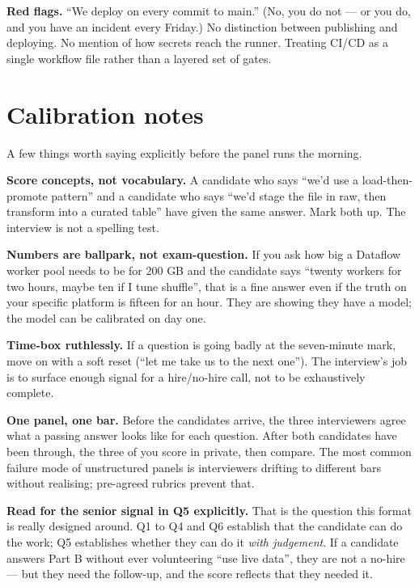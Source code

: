 \documentclass[
  11pt,
  british,
  oneside]{book}
\begin{document}
\textbf{Red flags.} ``We deploy on every commit to main.'' (No, you do
not --- or you do, and you have an incident every Friday.) No
distinction between publishing and deploying. No mention of how secrets
reach the runner. Treating CI/CD as a single workflow file rather than a
layered set of gates.

\hypertarget{calibration-notes}{%
\section{Calibration notes}\label{calibration-notes}}

A few things worth saying explicitly before the panel runs the morning.

\textbf{Score concepts, not vocabulary.} A candidate who says ``we'd use
a load-then-promote pattern'' and a candidate who says ``we'd stage the
file in raw, then transform into a curated table'' have given the same
answer. Mark both up. The interview is not a spelling test.

\textbf{Numbers are ballpark, not exam-question.} If you ask how big a
Dataflow worker pool needs to be for 200 GB and the candidate says
``twenty workers for two hours, maybe ten if I tune shuffle'', that is a
fine answer even if the truth on your specific platform is fifteen for
an hour. They are showing they have a model; the model can be calibrated
on day one.

\textbf{Time-box ruthlessly.} If a question is going badly at the
seven-minute mark, move on with a soft reset (``let me take us to the
next one''). The interview's job is to surface enough signal for a
hire/no-hire call, not to be exhaustively complete.

\textbf{One panel, one bar.} Before the candidates arrive, the three
interviewers agree what a passing answer looks like for each question.
After both candidates have been through, the three of you score in
private, then compare. The most common failure mode of unstructured
panels is interviewers drifting to different bars without realising;
pre-agreed rubrics prevent that.

\textbf{Read for the senior signal in Q5 explicitly.} That is the
question this format is really designed around. Q1 to Q4 and Q6
establish that the candidate can do the work; Q5 establishes whether
they can do it \emph{with judgement}. If a candidate answers Part B
without ever volunteering ``use live data'', they are not a no-hire ---
but they need the follow-up, and the score reflects that they needed it.
\end{document}
